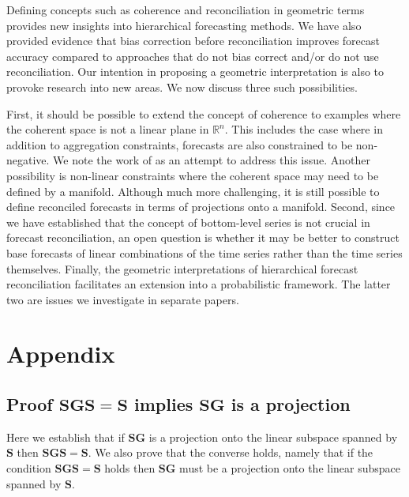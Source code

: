 \documentclass[12pt]{article}
\theoremstyle{definition}
\begin{document}
{Defining concepts such as coherence and reconciliation in geometric terms provides new insights into hierarchical forecasting methods. We have also provided evidence that bias correction before reconciliation improves forecast accuracy compared to approaches that do not bias correct and/or do not use reconciliation. Our intention in proposing a geometric interpretation is also to provoke research into new areas. We now discuss three such possibilities.

First, it should be possible to extend the concept of coherence {\color{blue}to examples where the coherent space is not a linear plane in $\mathbb{R}^n$.  This includes the case where in addition to aggregation constraints, forecasts are also constrained to be non-negative. We note the work of \cite{wickramasuriya2019optimal} as an attempt to address this issue.  Another possibility is} non-linear constraints where the coherent space may need to be defined by a manifold. Although much more challenging, it is still possible to define reconciled forecasts in terms of projections onto a manifold. Second, since we have established that the concept of bottom-level series is not crucial in forecast reconciliation, an open question is whether it may be better to construct base forecasts of linear combinations of the time series rather than the time series themselves. Finally, the geometric interpretations of hierarchical forecast reconciliation facilitates an extension into a probabilistic framework. The latter two are issues we investigate in separate papers.

\clearpage
\appendix

\section{Appendix}

\subsection{Proof $\bm{S}\bm{G}\bm{S}=\bm{S}$ implies $\bm{S}\bm{G}$ is a projection}\label{app:projection-proof}

Here we establish that if $\bm{S}\bm{G}$ is a projection onto the linear subspace spanned by $\bm{S}$ then $\bm{S}\bm{G}\bm{S}=\bm{S}$. We also prove that the converse holds, namely that if the condition $\bm{S}\bm{G}\bm{S}=\bm{S}$ holds then $\bm{S}\bm{G}$ must be a projection onto the linear subspace spanned by $\bm{S}$.

}
\end{document}
